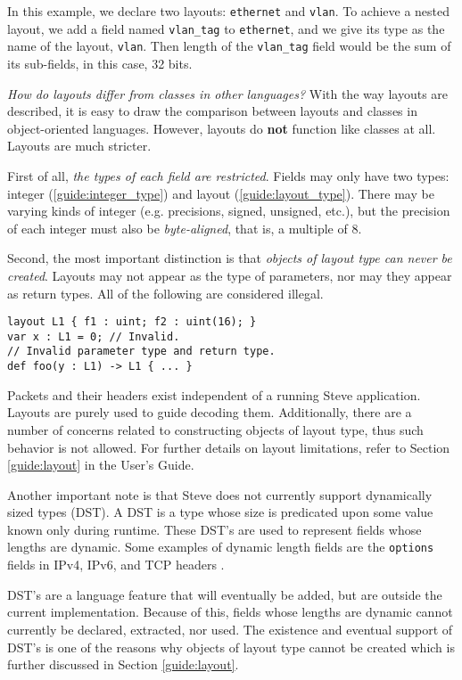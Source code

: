 In this example, we declare two layouts: \texttt{ethernet} and \texttt{vlan}. To achieve a nested layout, we add a field named \texttt{vlan\_tag} to \texttt{ethernet}, and we give its type as the name of the layout, \texttt{vlan}. Then length of the \texttt{vlan\_tag} field would be the sum of its sub-fields, in this case, 32 bits.

\textit{How do layouts differ from classes in other languages?} With the way layouts are described, it is easy to draw the comparison between layouts and classes in object-oriented languages. However, layouts do \textbf{not} function like classes at all. Layouts are much stricter.

First of all, \textit{the types of each field are restricted}. Fields may only have two types: integer (\ref{guide:integer_type}) and layout (\ref{guide:layout_type}). There may be varying kinds of integer (e.g. precisions, signed, unsigned, etc.), but the precision of each integer must also be \textit{byte-aligned}, that is, a multiple of 8. 

Second, the most important distinction is that \textit{objects of layout type can never be created}. Layouts may not appear as the type of parameters, nor may they appear as return types. All of the following are considered illegal.

\begin{codepage}
\begin{lstlisting}
layout L1 { f1 : uint; f2 : uint(16); }
var x : L1 = 0; // Invalid.
// Invalid parameter type and return type.
def foo(y : L1) -> L1 { ... }
\end{lstlisting}
\end{codepage} 

Packets and their headers exist independent of a running Steve application. Layouts are purely used to guide decoding them. Additionally, there are a number of concerns related to constructing objects of layout type, thus such behavior is not allowed. For further details on layout limitations, refer to Section \ref{guide:layout} in the User's Guide.

Another important note is that Steve does not currently support dynamically sized types (DST). A DST is a type whose size is predicated upon some value known only during runtime. These DST's are used to represent fields whose lengths are dynamic. Some examples of dynamic length fields are the \texttt{options} fields in IPv4, IPv6, and TCP headers \cite{ipv4_std, ipv6_std, tcp_std}.

DST's are a language feature that will eventually be added, but are outside the current implementation. Because of this, fields whose lengths are dynamic cannot currently be declared, extracted, nor used. The existence and eventual support of DST's is one of the reasons why objects of layout type cannot be created which is further discussed in Section \ref{guide:layout}.

